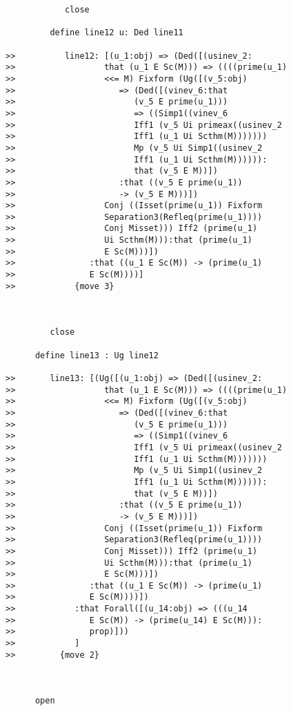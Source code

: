 \documentclass[12pt]{article}
\begin{document}
\begin{verbatim}
            close

         define line12 u: Ded line11

>>          line12: [(u_1:obj) => (Ded([(usinev_2:
>>                  that (u_1 E Sc(M))) => ((((prime(u_1)
>>                  <<= M) Fixform (Ug([(v_5:obj)
>>                     => (Ded([(vinev_6:that
>>                        (v_5 E prime(u_1)))
>>                        => ((Simp1((vinev_6
>>                        Iff1 (v_5 Ui primeax((usinev_2
>>                        Iff1 (u_1 Ui Scthm(M)))))))
>>                        Mp (v_5 Ui Simp1((usinev_2
>>                        Iff1 (u_1 Ui Scthm(M)))))):
>>                        that (v_5 E M))])
>>                     :that ((v_5 E prime(u_1))
>>                     -> (v_5 E M)))])
>>                  Conj ((Isset(prime(u_1)) Fixform
>>                  Separation3(Refleq(prime(u_1))))
>>                  Conj Misset))) Iff2 (prime(u_1)
>>                  Ui Scthm(M))):that (prime(u_1)
>>                  E Sc(M)))])
>>               :that ((u_1 E Sc(M)) -> (prime(u_1)
>>               E Sc(M))))]
>>            {move 3}



         close

      define line13 : Ug line12

>>       line13: [(Ug([(u_1:obj) => (Ded([(usinev_2:
>>                  that (u_1 E Sc(M))) => ((((prime(u_1)
>>                  <<= M) Fixform (Ug([(v_5:obj)
>>                     => (Ded([(vinev_6:that
>>                        (v_5 E prime(u_1)))
>>                        => ((Simp1((vinev_6
>>                        Iff1 (v_5 Ui primeax((usinev_2
>>                        Iff1 (u_1 Ui Scthm(M)))))))
>>                        Mp (v_5 Ui Simp1((usinev_2
>>                        Iff1 (u_1 Ui Scthm(M)))))):
>>                        that (v_5 E M))])
>>                     :that ((v_5 E prime(u_1))
>>                     -> (v_5 E M)))])
>>                  Conj ((Isset(prime(u_1)) Fixform
>>                  Separation3(Refleq(prime(u_1))))
>>                  Conj Misset))) Iff2 (prime(u_1)
>>                  Ui Scthm(M))):that (prime(u_1)
>>                  E Sc(M)))])
>>               :that ((u_1 E Sc(M)) -> (prime(u_1)
>>               E Sc(M))))])
>>            :that Forall([(u_14:obj) => (((u_14
>>               E Sc(M)) -> (prime(u_14) E Sc(M))):
>>               prop)]))
>>            ]
>>         {move 2}



      open


\end{verbatim}
\end{document}
